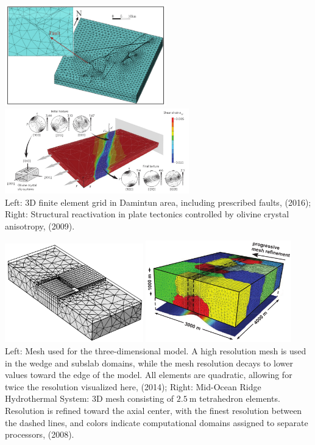 \begin{center}
\includegraphics[width=7cm]{images/meshes/guyr16}
\includegraphics[width=8cm]{images/meshes/tokv09}\\
{\captionfont 
Left: 3D finite element grid in Damintun area, including prescribed faults, \textcite{guyr16} (2016);
Right: Structural reactivation in plate tectonics controlled by olivine crystal anisotropy, \textcite{tokv09} (2009).
}
\end{center}

\begin{center}
\includegraphics[width=6cm]{images/meshes/paml14b}
\includegraphics[width=6.3cm]{images/meshes/codh08}\\
{\captionfont 
Left: Mesh used for the three-dimensional model. A high resolution mesh is used in
the wedge and subslab domains, while the mesh resolution decays to lower values
toward the edge of the model. All elements are quadratic, allowing for twice the
resolution visualized here, \textcite{paml14b} (2014);
Right: Mid-Ocean Ridge Hydrothermal System: 3D mesh consisting of $2.5~\si{\meter}$ tetrahedron elements. 
Resolution is refined toward the axial center, with the finest resolution between the dashed
lines, and colors indicate computational domains assigned to separate processors, 
\textcite{codh08} (2008).}
\end{center}

